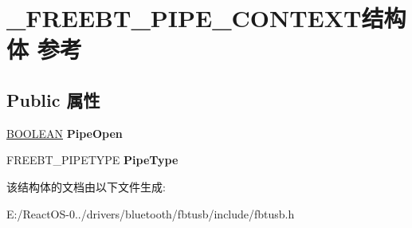 \hypertarget{struct___f_r_e_e_b_t___p_i_p_e___c_o_n_t_e_x_t}{}\section{\+\_\+\+F\+R\+E\+E\+B\+T\+\_\+\+P\+I\+P\+E\+\_\+\+C\+O\+N\+T\+E\+X\+T结构体 参考}
\label{struct___f_r_e_e_b_t___p_i_p_e___c_o_n_t_e_x_t}
\subsection*{Public 属性}
\begin{DoxyCompactItemize}
\item 
\mbox{\label{struct___f_r_e_e_b_t___p_i_p_e___c_o_n_t_e_x_t_a6103578ed3ade34fb12e91d7d389e815}} 
\hyperlink{_processor_bind_8h_a112e3146cb38b6ee95e64d85842e380a}{B\+O\+O\+L\+E\+AN} {\bfseries Pipe\+Open}
\item 
\mbox{\label{struct___f_r_e_e_b_t___p_i_p_e___c_o_n_t_e_x_t_a67ff3b92b8fb9fd457eaba5c2a751c72}} 
F\+R\+E\+E\+B\+T\+\_\+\+P\+I\+P\+E\+T\+Y\+PE {\bfseries Pipe\+Type}
\end{DoxyCompactItemize}


该结构体的文档由以下文件生成\+:\begin{DoxyCompactItemize}
\item 
E\+:/\+React\+O\+S-\/0../drivers/bluetooth/fbtusb/include/fbtusb.\+h\end{DoxyCompactItemize}
